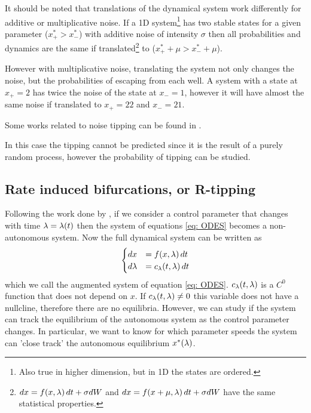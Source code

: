 It should be noted that translations of the dynamical system work differently for additive or multiplicative noise.  
If a 1D system\footnote{Also true in higher dimension, but in 1D the states are ordered.} has two stable states for a given parameter ($x_+^*>x_-^*$) with additive noise of intensity $\sigma$ then all probabilities and dynamics are the same if translated\footnote{$dx=f(x,\lambda)\, dt+ \sigma dW$ and $dx=f(x+\mu,\lambda)\, dt+ \sigma dW$  have the same statistical properties.} to ($x_+^*+\mu>x_-^*+\mu$). 

However with multiplicative noise, translating the system not only changes the noise, but the probabilities of escaping from each well. A system with a state at $x_+=2$ has twice the noise of the state at  $x_-=1$, however it will have almost the same noise if translated to  $x_+=22$ and $x_-=21$.

Some works related to noise tipping can be found in \citep{Sharma2015}.

In this case the tipping cannot be predicted since it is the result of a purely random  process, however the probability of tipping can be studied.






\subsection{Rate induced bifurcations, or R-tipping}

Following the work done by \cite{Ashwin2012,Kees2017a,Kiers2020a}, if we consider a control parameter that changes with time $\lambda=\lambda(t)$ then the system of equations \eqref{eq: ODES} becomes a  non-autonomous system. 
Now the full dynamical system can be written as
\begin{equation}
	\begin{cases}
		d x&=f(x,\lambda) \, dt\\
		d \lambda&= c_\lambda(t,\lambda)\, dt
	\end{cases}
\label{eq:Aug1}
\end{equation}
which we call the augmented system of  equation \eqref{eq: ODES}.
 $c_\lambda(t,\lambda)$ is a $C^0$ function that does not depend on $x$. 
If $c_\lambda(t,\lambda) \neq 0$ this variable does not have a nullcline, therefore there  are no equilibria. However, we can study if the system can track the equilibrium of the autonomous system as the control parameter changes. 
In particular, we want to know for which parameter speeds the system can 'close track'  the autonomous equilibrium $x^*(\lambda)$. 

